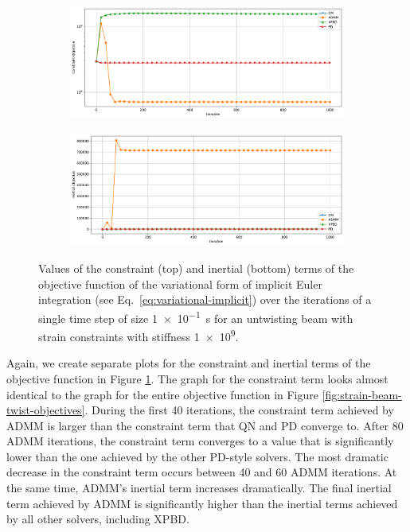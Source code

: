 \begin{figure}[t]
    \centering
    \begin{subfigure}{\textwidth}
        \includegraphics[width=\linewidth]{figures/strain_beam_twist_constraintObjective.pdf}
    \end{subfigure}
    \begin{subfigure}{\textwidth}
        \includegraphics[width=\linewidth]{figures/strain_beam_twist_inertialObjective.pdf}
    \end{subfigure}
    \caption{Values of the constraint (top) and inertial (bottom) terms of the objective function of the variational form of implicit Euler integration 
        (see Eq.\ \ref{eq:variational-implicit}) over the iterations of a single time step of size \SI{1e-1}{\second} for an untwisting beam with strain 
    constraints with stiffness \num{1e9}.}
    \label{fig:strain-beam-twist-objectives-split}
\end{figure}

Again, we create separate plots for the constraint and inertial terms of the objective function in Figure \ref{fig:strain-beam-twist-objectives-split}. The graph for the 
constraint term looks almost identical to the graph for the entire objective function in Figure \ref{fig:strain-beam-twist-objectives}. During the first 40 iterations, the 
constraint term achieved by ADMM is larger than the constraint term that QN and PD converge to. After 80 ADMM iterations, the constraint term converges to a value that is 
significantly lower than the one achieved by the other PD-style solvers. The most dramatic decrease in the constraint term occurs between 40 and 60 ADMM iterations. At the 
same time, ADMM's inertial term increases dramatically. The final inertial term achieved by ADMM is significantly higher than the inertial terms achieved by all other solvers, 
including XPBD.

